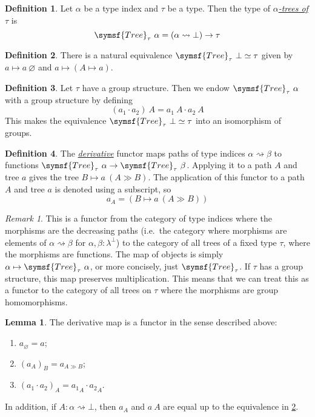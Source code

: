 \documentclass{article}
\newcommand{\cdef}[3]{\href{https://leanprover-community.github.io/con-nf/doc/ConNF/#1.html\#ConNF.#2}{\emph{#3}}}
\theoremstyle{definition}
\newtheorem{definition}{Definition}[section]
\newtheorem{lemma}[theorem]{Lemma}
\theoremstyle{remark}
\newtheorem*{remark}{Remark}
\begin{document}
\begin{definition}
    Let \( \alpha \) be a type index and \( \tau \) be a type.
    Then the type of \cdef{Structural/Tree}{Tree}{\( \alpha \)-trees of \( \tau \)} is
    \[ \symsf{Tree}_\tau\ \alpha = (\alpha \rightsquigarrow \bot) \to \tau \]
\end{definition}
\begin{definition}
    \label{def:tree_ofBot}
    There is a natural equivalence \( \symsf{Tree}_\tau\ \bot \simeq \tau \) given by \( a \mapsto a\ \varnothing \) and \( a \mapsto (A \mapsto a) \).
\end{definition}
\begin{definition}
    Let \( \tau \) have a group structure.
    Then we endow \( \symsf{Tree}_\tau\ \alpha \) with a group structure by defining
    \[ (a_1 \cdot a_2)\ A = a_1\ A \cdot a_2\ A \]
    This makes the equivalence \( \symsf{Tree}_\tau\ \bot \simeq \tau \) into an isomorphism of groups.
\end{definition}
\begin{definition}
    \label{def:derivative}
    The \cdef{Structural/Tree}{Tree.comp}{derivative} functor maps paths of type indices \( \alpha \rightsquigarrow \beta \) to functions \( \symsf{Tree}_\tau\ \alpha \to \symsf{Tree}_\tau\ \beta \).
    Applying it to a path \( A \) and tree \( a \) gives the tree \( B \mapsto a\ (A \gg B) \).
    The application of this functor to a path \( A \) and tree \( a \) is denoted using a subscript, so
    \[ a_A = (B \mapsto a\ (A \gg B)) \]
\end{definition}
\begin{remark}
    This is a functor from the category of type indices where the morphisms are the decreasing paths (i.e.\ the category where morphisms are elements of \( \alpha \rightsquigarrow \beta \) for \( \alpha, \beta : \lambda^\bot \)) to the category of all trees of a fixed type \( \tau \), where the morphisms are functions.
    The map of objects is simply \( \alpha \mapsto \symsf{Tree}_\tau\ \alpha \), or more concisely, just \( \symsf{Tree}_\tau \).
    If \( \tau \) has a group structure, this map preserves multiplication.
    This means that we can treat this as a functor to the category of all trees on \( \tau \) where the morphisms are group homomorphisms.
\end{remark}
\begin{lemma}
    \label{lem:derivative_functor}
    The derivative map is a functor in the sense described above:
    \begin{enumerate}
        \item \( a_\varnothing = a \);
        \item \( (a_A)_B = a_{A \gg B} \);
        \item \( (a_1 \cdot a_2)_A = {a_1}_A \cdot {a_2}_A \).
    \end{enumerate}
    In addition, if \( A : \alpha \rightsquigarrow \bot \), then \( a_A \) and \( a\ A \) are equal up to the equivalence in \cref{def:tree_ofBot}.
\end{lemma}
\end{document}
